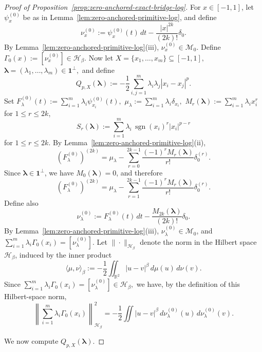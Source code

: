 \documentclass[11pt]{article}
\theoremstyle{definition}
\begin{document}
\begin{proof}[Proof of Proposition~\ref{prop:zero-anchored-exact-bridge-log}]
For $x\in[-1,1]$, let $\psi_x^{(0)}$ be as in
Lemma~\ref{lem:zero-anchored-primitive-log}, and define
\[
\nu_x^{(0)}:=\psi_x^{(0)}(t)\,dt-\frac{|x|^{2k}}{(2k)!}\delta_0.
\]
By Lemma~\ref{lem:zero-anchored-primitive-log}\textnormal{(iii)}, $\nu_x^{(0)}\in \mathcal M_0$.
Define
\(
\Gamma_0(x):=[\nu_x^{(0)}]\in \mathcal H_\beta.
\)
Now let
\(
X=\{x_1,\dots,x_m\}\subseteq [-1,1],
\)
\(
\boldsymbol\lambda=(\lambda_1,\dots,\lambda_m)\in \boldsymbol{1}^{\perp},
\)
and define
\[
Q_{p,X}(\boldsymbol\lambda):=
-\frac12\sum_{i,j=1}^m \lambda_i\lambda_j|x_i-x_j|^p.
\]
Set
\(
F_\lambda^{(0)}(t):=\sum_{i=1}^m \lambda_i\psi_{x_i}^{(0)}(t),\)
\(
\mu_\lambda:=\sum_{i=1}^m \lambda_i\delta_{x_i},
\)
\(
M_r(\boldsymbol\lambda):=\sum_{i=1}^m \lambda_i x_i^r
\)
for \(1\le r\le 2k\),
\[
S_r(\boldsymbol\lambda):=\sum_{i=1}^m \lambda_i\,\operatorname{sgn}(x_i)^r|x_i|^{p-r}
\]
for \(1\le r\le 2k.\)
By Lemma~\ref{lem:zero-anchored-primitive-log}\textnormal{(ii)},
\[
(F_\lambda^{(0)})^{(2k)}
=
\mu_\lambda-\sum_{r=0}^{2k-1}\frac{(-1)^r M_r(\boldsymbol\lambda)}{r!}\delta_0^{(r)}.
\]
Since $\boldsymbol\lambda\in\boldsymbol{1}^{\perp}$, we have $M_0(\boldsymbol\lambda)=0$, and therefore
\begin{equation}\label{eq:primitive-distribution-log}
(F_\lambda^{(0)})^{(2k)}
=
\mu_\lambda-\sum_{r=1}^{2k-1}\frac{(-1)^r M_r(\boldsymbol\lambda)}{r!}\delta_0^{(r)}.
\end{equation}
Define also
\[
\nu_\lambda^{(0)}:=F_\lambda^{(0)}(t)\,dt-\frac{M_{2k}(\boldsymbol\lambda)}{(2k)!}\delta_0.
\]
By Lemma~\ref{lem:zero-anchored-primitive-log}\textnormal{(iii)}, $\nu_\lambda^{(0)}\in\mathcal M_0$, and
\(
\sum_{i=1}^m \lambda_i\Gamma_0(x_i)=[\nu_\lambda^{(0)}].
\)
Let \(\|\cdot\|_{\mathcal H_\beta}\) denote the norm in the Hilbert
space \(\mathcal H_\beta\), induced by the inner product
\[
\langle \mu,\nu\rangle_\beta
:=
-\frac12\iint_{\mathbb R^2}|u-v|^\beta\,d\mu(u)\,d\nu(v).
\]
Since
\(
\sum_{i=1}^m\lambda_i\Gamma_0(x_i)=[\nu_\lambda^{(0)}]\in\mathcal H_\beta,
\)
we have, by the definition of this Hilbert-space norm,
\begin{equation}\label{eq:nu-energy-log}
\left\|\sum_{i=1}^m \lambda_i\Gamma_0(x_i)\right\|_{\mathcal H_\beta}^2
=
-\frac12\iint |u-v|^\beta\,d\nu_\lambda^{(0)}(u)\,d\nu_\lambda^{(0)}(v).
\end{equation}

We now compute $Q_{p,X}(\boldsymbol\lambda)$.


\end{proof}
\end{document}
